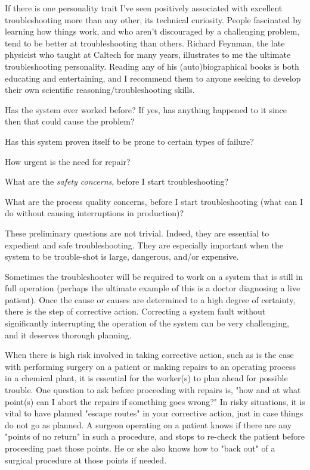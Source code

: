 If there is one personality trait I've seen positively associated with
excellent troubleshooting more than any other, its technical curiosity.
People fascinated by learning how things work, and who aren't
discouraged by a challenging problem, tend to be better at
troubleshooting than others. Richard Feynman, the late physicist who
taught at Caltech for many years, illustrates to me the ultimate
troubleshooting personality. Reading any of his (auto)biographical books
is both educating and entertaining, and I recommend them to anyone
seeking to develop their own scientific reasoning/troubleshooting
skills.

\stopsection

\startsection[title={Questions to Ask Before
Proceeding},reference={sec:xtocid15790971}]

\startitemize[packed]
\item
  Has the system ever worked before? If yes, has anything happened to it
  since then that could cause the problem?
\item
  Has this system proven itself to be prone to certain types of failure?
\item
  How urgent is the need for repair?
\item
  What are the {\em safety concerns}, before I start troubleshooting?
\item
  What are the process quality concerns, before I start troubleshooting
  (what can I do without causing interruptions in production)?
\stopitemize

These preliminary questions are not trivial. Indeed, they are essential
to expedient and safe troubleshooting. They are especially important
when the system to be trouble-shot is large, dangerous, and/or
expensive.

Sometimes the troubleshooter will be required to work on a system that
is still in full operation (perhaps the ultimate example of this is a
doctor diagnosing a live patient). Once the cause or causes are
determined to a high degree of certainty, there is the step of
corrective action. Correcting a system fault without significantly
interrupting the operation of the system can be very challenging, and it
deserves thorough planning.

When there is high risk involved in taking corrective action, such as is
the case with performing surgery on a patient or making repairs to an
operating process in a chemical plant, it is essential for the worker(s)
to plan ahead for possible trouble. One question to ask before
proceeding with repairs is, "how and at what point(s) can I abort the
repairs if something goes wrong?" In risky situations, it is vital to
have planned "escape routes" in your corrective action, just in case
things do not go as planned. A surgeon operating on a patient knows if
there are any "points of no return" in such a procedure, and stops to
re-check the patient before proceeding past those points. He or she also
knows how to "back out" of a surgical procedure at those points if
needed.

